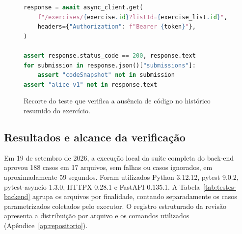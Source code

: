 \begin{figure}[htbp]
\centering
\caption{Recorte do teste que verifica a ausência de código no histórico resumido do exercício.}
\label{lst:resumo-submissao}
\begin{lstlisting}[language=Python]
response = await async_client.get(
    f"/exercises/{exercise.id}?listId={exercise_list.id}",
    headers={"Authorization": f"Bearer {token}"},
)

assert response.status_code == 200, response.text
for submission in response.json()["submissions"]:
    assert "codeSnapshot" not in submission
assert "alice-v1" not in response.text
\end{lstlisting}
\end{figure}

\subsection{Resultados e alcance da verificação}
\label{subsec:resultados-testes-backend}

Em 19 de setembro de 2026, a execução local da suíte completa do back-end aprovou 188 casos em 17 arquivos, sem falhas ou casos ignorados, em aproximadamente 59 segundos. Foram utilizados Python 3.12.12, pytest 9.0.2, pytest-asyncio 1.3.0, HTTPX 0.28.1 e FastAPI 0.135.1. A Tabela~\ref{tab:testes-backend} agrupa os arquivos por finalidade, contando separadamente os casos parametrizados coletados pelo executor. O registro estruturado da revisão apresenta a distribuição por arquivo e os comandos utilizados (Apêndice~\ref{ap:repositorio}).

